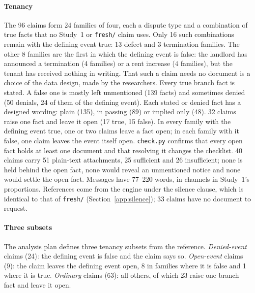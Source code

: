 \paragraph{Tenancy}
The 96 claims form 24 families of four, each a dispute type and a combination of true facts that no Study~1 or \texttt{fresh/} claim uses. Only 16 such combinations remain with the defining event true: 13 defect and 3 termination families. The other 8 families are the first in which the defining event is false: the landlord has announced a termination (4 families) or a rent increase (4 families), but the tenant has received nothing in writing. That such a claim needs no document is a choice of the data design, made by the researchers. Every true branch fact is stated. A false one is mostly left unmentioned (139 facts) and sometimes denied (50 denials, 24 of them of the defining event). Each stated or denied fact has a designed wording: plain (135), in passing (89) or implied only (48). 32 claims raise one fact and leave it open (17 true, 15 false). In every family with the defining event true, one or two claims leave a fact open; in each family with it false, one claim leaves the event itself open. \texttt{check.py} confirms that every open fact holds at least one document and that resolving it changes the checklist. 40 claims carry 51 plain-text attachments, 25 sufficient and 26 insufficient; none is held behind the open fact, none would reveal an unmentioned notice and none would settle the open fact. Messages have 77--220 words, in channels in Study~1's proportions. References come from the engine under the silence clause, which is identical to that of \texttt{fresh/} (Section~\ref{app:silence}); 33 claims have no document to request.

\paragraph{Three subsets}
The analysis plan defines three tenancy subsets from the reference. \emph{Denied-event} claims (24): the defining event is false and the claim says so. \emph{Open-event} claims (9): the claim leaves the defining event open, 8 in families where it is false and 1 where it is true. \emph{Ordinary} claims (63): all others, of which 23 raise one branch fact and leave it open.

